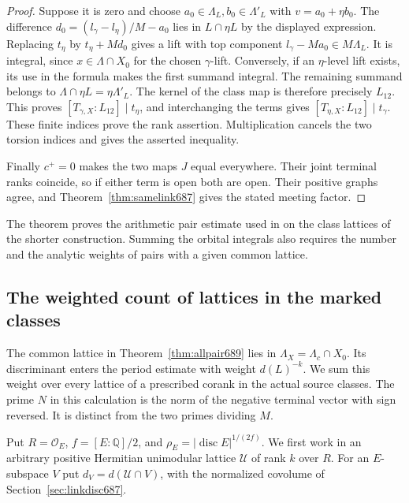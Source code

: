 \documentclass[a4paper,11pt]{article}
\theoremstyle{definition}
\theoremstyle{remark}
\numberwithin{equation}{section}
\begin{document}
\begin{proof}
Suppose it is zero and choose
\(a_0\in\Lambda_L,b_0\in\Lambda'_L\) with \(v=a_0+\eta b_0\).
The difference \(d_0=(l_\gamma-l_\eta)/M-a_0\) lies in
\(L\cap\eta L\) by the displayed expression. Replacing
\(t_\eta\) by \(t_\eta+M d_0\) gives a lift with top
component \(l_\gamma-Ma_0\in M\Lambda_L\). It is integral,
since \(x\in\Lambda\cap X_0\) for the chosen \(\gamma\)-lift.
Conversely, if an \(\eta\)-level lift exists, its use in the
formula makes the first summand integral. The remaining
summand belongs to \(\Lambda\cap\eta L=\eta\Lambda'_L\).
The kernel of the class map is therefore precisely \(L_{12}\).
This proves \([T_{\gamma,X}:L_{12}]\mid t_\eta\), and
interchanging the terms gives \([T_{\eta,X}:L_{12}]\mid
t_\gamma\). These finite indices prove the rank assertion.
Multiplication cancels the two torsion indices and gives
the asserted inequality.

Finally \(c^+=0\) makes the two maps \(J\) equal everywhere.
Their joint terminal ranks coincide, so if either term is
open both are open. Their positive graphs agree, and
Theorem~\ref{thm:samelink687} gives the stated meeting factor.
\end{proof}

The theorem proves the arithmetic pair estimate used in
 on the class lattices
of the shorter construction. Summing the orbital integrals also
requires the number and the analytic weights of pairs with a
given common lattice.


\subsection{The weighted count of lattices in the marked classes}
\label{sec:latticemean690}

The common lattice in Theorem~\ref{thm:allpair689} lies in
\(\Lambda_X=\Lambda_c\cap X_0\). Its discriminant enters the
period estimate with weight \(d(L)^{-k}\). We sum this weight
over every lattice of a prescribed corank in the actual source
classes. The prime \(N\) in this calculation is the norm of the
negative terminal vector with sign reversed. It is distinct from
the two primes dividing \(M\).

Put \(R=\mathcal O_E\), \(f=[E:\mathbb Q]/2\), and
\(\rho_E=|\operatorname{disc}E|^{1/(2f)}\). We first work in an
arbitrary positive Hermitian unimodular lattice \(\mathcal U\)
of rank \(k\) over \(R\). For an \(E\)-subspace \(V\) put
\(d_V=d(\mathcal U\cap V)\), with the normalized covolume of
Section~\ref{sec:linkdisc687}.
\end{document}

